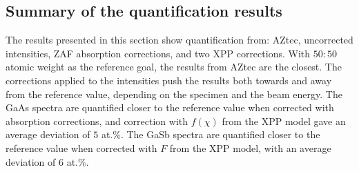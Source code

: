 














\subsection{Summary of the quantification results}
\label{results:quantification_summary}

The results presented in this section show quantification from: AZtec, uncorrected intensities, ZAF absorption corrections, and two XPP corrections.
With $50:50$ atomic weight as the reference goal, the results from AZtec are the closest.
The corrections applied to the intensities push the results both towards and away from the reference value, depending on the specimen and the beam energy.
The GaAs spectra are quantified closer to the reference value when corrected with absorption corrections, and correction with $f(\chi)$ from the XPP model gave an average deviation of $5$ at.\%.
The GaSb spectra are quantified closer to the reference value when corrected with $F$ from the XPP model, with an average deviation of $6$ at.\%.